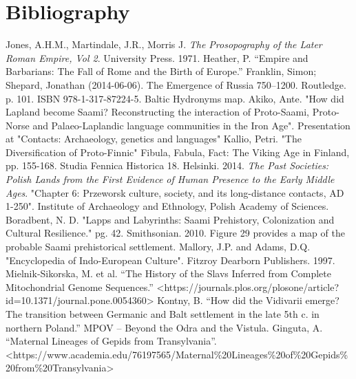 \documentclass{article}
\newcommand{\specificCite}[1]{\tiny #1 \normalsize}
\begin{document}
	\newpage
	
	\section{Bibliography}
	\label{sec:Bibliography}
	
	\begin{thebibliography}{99}
		Jones, A.H.M., Martindale, J.R., Morris J. \textit{The Prosopography of the Later Roman Empire, Vol 2}. University Press. 1971.
		Heather, P. “Empire and Barbarians: The Fall of Rome and the Birth of Europe.”
		Franklin, Simon; Shepard, Jonathan (2014-06-06). The Emergence of Russia 750–1200. Routledge. p. 101. ISBN 978-1-317-87224-5.
		Baltic Hydronyms map.
		Akiko, Ante. "How did Lapland become Saami? Reconstructing the interaction of Proto-Saami, Proto-Norse and Palaeo-Laplandic language communities in the Iron Age". Presentation at "Contacts: Archaeology, genetics and languages"
		Kallio, Petri. "The Diversification of Proto-Finnic" Fibula, Fabula, Fact: The Viking Age in Finland, pp. 155-168. Studia Fennica Historica 18. Helsinki. 2014.
		\textit{The Past Societies: Polish Lands from the First Evidence of Human Presence to the Early Middle Ages}. "Chapter 6: Przeworsk culture, society, and its long-distance contacts, AD 1-250". Institute of Archaeology and Ethnology, Polish Academy of Sciences.
		Boradbent, N. D. "Lapps and Labyrinths:  Saami Prehistory, Colonization and Cultural Resilience." pg. 42. Smithsonian. 2010. \specificCite{Figure 29 provides a map of the probable Saami prehistorical settlement.}
		Mallory, J.P. and Adams, D.Q. "Encyclopedia of Indo-European Culture". Fitzroy Dearborn Publishers. 1997.
		Mielnik-Sikorska, M. et al. “The History of the Slavs Inferred from Complete Mitochondrial Genome Sequences.” <https://journals.plos.org/plosone/article?id=10.1371/journal.pone.0054360>
		Kontny, B. “How did the Vidivarii emerge? The transition between Germanic and Balt settlement in the late 5th c. in northern Poland.” MPOV – Beyond the Odra and the Vistula.
		Ginguta, A. “Maternal Lineages of Gepids from Transylvania”. <https://www.academia.edu/76197565/Maternal\%20Lineages\%20of\%20Gepids\%20from\%20Transylvania>

\end{thebibliography}
\end{document}
